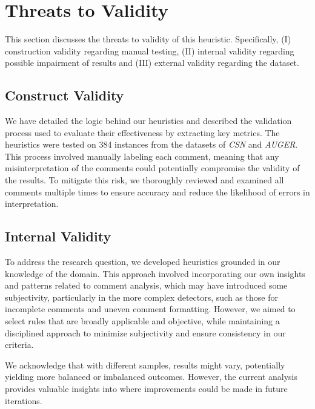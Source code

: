 \section{Threats to Validity}
This section discusses the threats to validity of this heuristic. Specifically, (I) construction validity regarding manual testing, (II) internal validity regarding possible impairment of results and (III) external validity regarding the dataset.

\subsection{Construct Validity}
We have detailed the logic behind our heuristics and described the validation process used to evaluate their effectiveness by extracting key metrics. The heuristics were tested on 384 instances from the datasets of \textit{CSN} and \textit{AUGER}. This process involved manually labeling each comment, meaning that any misinterpretation of the comments could potentially compromise the validity of the results. To mitigate this risk, we thoroughly reviewed and examined all comments multiple times to ensure accuracy and reduce the likelihood of errors in interpretation.

\subsection{Internal Validity}
To address the research question, we developed heuristics grounded in our knowledge of the domain. This approach involved incorporating our own insights and patterns related to comment analysis, which may have introduced some subjectivity, particularly in the more complex detectors, such as those for incomplete comments and uneven comment formatting. However, we aimed to select rules that are broadly applicable and objective, while maintaining a disciplined approach to minimize subjectivity and ensure consistency in our criteria.

\noindent We acknowledge that with different samples, results might vary, potentially yielding more balanced or imbalanced outcomes. However, the current analysis provides valuable insights into where improvements could be made in future iterations.

